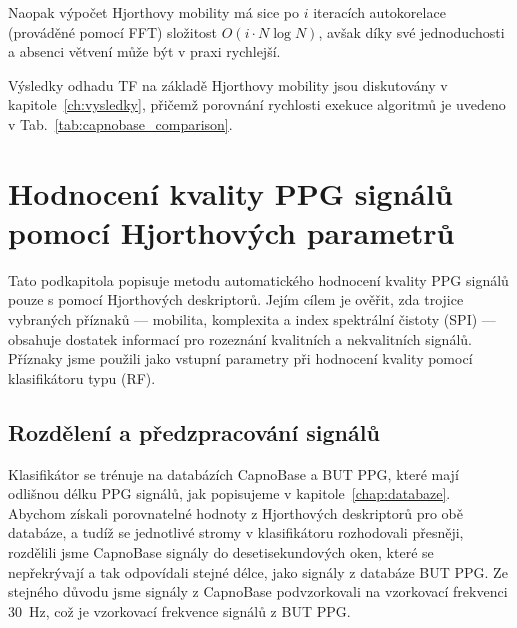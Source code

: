 Naopak výpočet Hjorthovy mobility má sice po \( i \) iteracích autokorelace (prováděné pomocí \acs{FFT}) složitost \( O(i \cdot N \log N) \), avšak díky své jednoduchosti a absenci větvení může být v praxi rychlejší.

Výsledky odhadu \acs{TF} na základě Hjorthovy mobility jsou diskutovány v kapitole~\ref{ch:vysledky}, přičemž porovnání rychlosti exekuce algoritmů je uvedeno v Tab.~\ref{tab:capnobase_comparison}. %

\section{Hodnocení kvality PPG signálů pomocí Hjorthových parametrů}
\label{sec:hjorth_kvalita}
Tato podkapitola popisuje metodu automatického hodnocení kvality \acs{PPG} signálů pouze s pomocí Hjorthových deskriptorů.
Jejím cílem je ověřit, zda trojice vybraných příznaků — mobilita, komplexita a index spektrální čistoty (\acs{SPI}) — obsahuje dostatek informací pro rozeznání kvalitních a nekvalitních signálů.
Příznaky jsme použili jako vstupní parametry při hodnocení kvality pomocí klasifikátoru typu  (\acs{RF}).

\subsection*{Rozdělení a předzpracování signálů}
Klasifikátor se trénuje na databázích CapnoBase a \acs{BUT PPG}, které mají odlišnou délku \acs{PPG} signálů, jak popisujeme v kapitole~\ref{chap:databaze}.
Abychom získali porovnatelné hodnoty z Hjorthových deskriptorů pro obě databáze, a tudíž se jednotlivé stromy v klasifikátoru rozhodovali přesněji, rozdělili jsme CapnoBase signály do desetisekundových oken, které se nepřekrývají a tak odpovídali stejné délce, jako signály z databáze \acs{BUT PPG}.
Ze stejného důvodu jsme signály z CapnoBase podvzorkovali na vzorkovací frekvenci 30~Hz, což je vzorkovací frekvence signálů z \acs{BUT PPG}.

